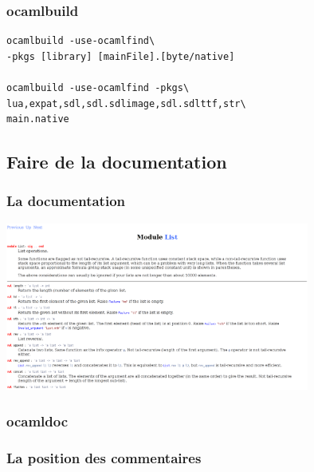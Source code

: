 \begin{frame}[fragile]
	\frametitle{ocamlbuild}
	\begin{lstlisting}
ocamlbuild -use-ocamlfind\
-pkgs [library] [mainFile].[byte/native]

ocamlbuild -use-ocamlfind -pkgs\
lua,expat,sdl,sdl.sdlimage,sdl.sdlttf,str\
main.native
	\end{lstlisting}
\end{frame}

\subsection{Faire de la documentation} %
\begin{frame}
	\frametitle{La documentation}
	\begin{center}
		\includegraphics[width=10cm]{pics/doc.png}
	\end{center}
\end{frame}

\begin{frame}
	\frametitle{ocamldoc}

\end{frame}

\begin{frame}
	\frametitle{La position des commentaires}

\end{frame}


